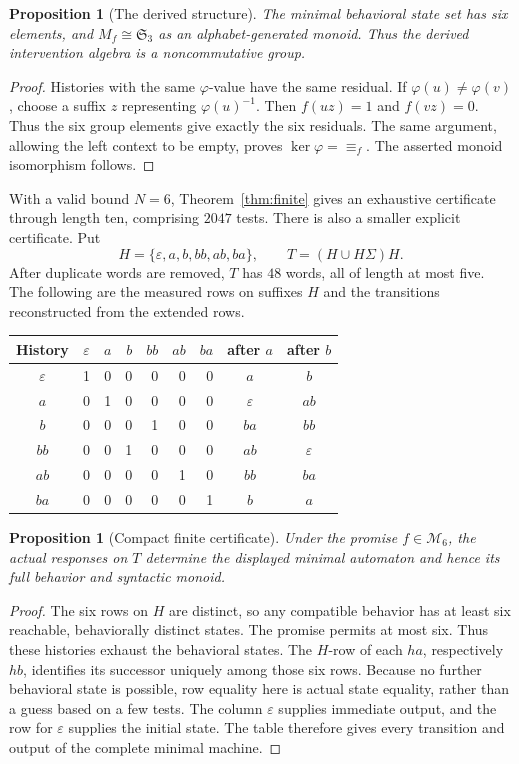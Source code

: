 \documentclass[11pt]{article}
\newtheorem{proposition}[theorem]{Proposition}
\theoremstyle{remark}
\newcommand{\eps}{\varepsilon}
\newcommand{\sg}{\mathfrak S_3}
\newcommand{\M}{\mathcal M}
\begin{document}
\begin{proposition}[The derived structure]
\label{prop:group}
The minimal behavioral state set has six elements, and $M_f\cong\sg$ as an alphabet-generated monoid. Thus the derived intervention algebra is a noncommutative group.
\end{proposition}
\begin{proof}
Histories with the same $\varphi$-value have the same residual. If $\varphi(u)\ne\varphi(v)$, choose a suffix $z$ representing $\varphi(u)^{-1}$. Then $f(uz)=1$ and $f(vz)=0$. Thus the six group elements give exactly the six residuals. The same argument, allowing the left context to be empty, proves $\ker\varphi={\equiv_f}$. The asserted monoid isomorphism follows.
\end{proof}

With a valid bound $N=6$, Theorem~\ref{thm:finite} gives an exhaustive certificate through length ten, comprising $2047$ tests. There is also a smaller explicit certificate. Put
\[
 H=\{\eps,a,b,bb,ab,ba\},\qquad T=(H\cup H\Sigma)H.
\]
After duplicate words are removed, $T$ has $48$ words, all of length at most five. The following are the measured rows on suffixes $H$ and the transitions reconstructed from the extended rows.

\begin{center}
\begin{tabular}{@{}c|rrrrrr|cc@{}}
\toprule
History & $\eps$ & $a$ & $b$ & $bb$ & $ab$ & $ba$ & after $a$ & after $b$\\
\midrule
$\eps$ &1&0&0&0&0&0&$a$&$b$\\
$a$    &0&1&0&0&0&0&$\eps$&$ab$\\
$b$    &0&0&0&1&0&0&$ba$&$bb$\\
$bb$   &0&0&1&0&0&0&$ab$&$\eps$\\
$ab$   &0&0&0&0&1&0&$bb$&$ba$\\
$ba$   &0&0&0&0&0&1&$b$&$a$\\
\bottomrule
\end{tabular}
\end{center}

\begin{proposition}[Compact finite certificate]
\label{prop:certificate}
Under the promise $f\in\M_6$, the actual responses on $T$ determine the displayed minimal automaton and hence its full behavior and syntactic monoid.
\end{proposition}
\begin{proof}
The six rows on $H$ are distinct, so any compatible behavior has at least six reachable, behaviorally distinct states. The promise permits at most six. Thus these histories exhaust the behavioral states. The $H$-row of each $ha$, respectively $hb$, identifies its successor uniquely among those six rows. Because no further behavioral state is possible, row equality here is actual state equality, rather than a guess based on a few tests. The column $\eps$ supplies immediate output, and the row for $\eps$ supplies the initial state. The table therefore gives every transition and output of the complete minimal machine.
\end{proof}
\end{document}
